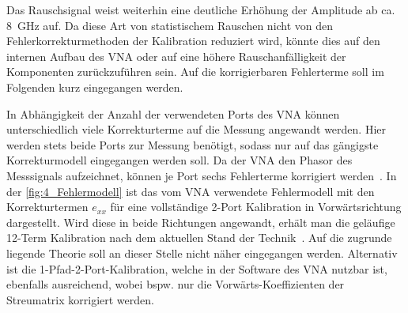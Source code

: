 Das Rauschsignal weist weiterhin eine deutliche Erhöhung der Amplitude ab ca. \SI{8}{\giga\hertz} auf. Da diese Art von statistischem Rauschen nicht von den Fehlerkorrekturmethoden der Kalibration reduziert wird, könnte dies auf den internen Aufbau des VNA oder auf eine höhere Rauschanfälligkeit der Komponenten zurückzuführen sein. Auf die korrigierbaren Fehlerterme soll im Folgenden kurz eingegangen werden.
\par
\vspace{\linespace}
In Abhängigkeit der Anzahl der verwendeten Ports des VNA können unterschiedlich viele Korrekturterme auf die Messung angewandt werden. Hier werden stets beide Ports zur Messung benötigt, sodass nur auf das gängigste Korrekturmodell eingegangen werden soll. Da der VNA den Phasor des Messsignals aufzeichnet, können je Port sechs Fehlerterme korrigiert werden~\cite{VNA-Handbuch}. In der \Abb\ref{fig:4_Fehlermodell} ist das vom VNA verwendete Fehlermodell mit den Korrekturtermen $e_{xx}$ für eine vollständige 2-Port Kalibration in Vorwärtsrichtung dargestellt. Wird diese in beide Richtungen angewandt, erhält man die geläufige \mbox{12-Term} Kalibration nach dem aktuellen Stand der Technik~\cite{VNA_Error_Models_and_Calibration_Methods}. Auf die zugrunde liegende Theorie soll an dieser Stelle nicht näher eingegangen werden. Alternativ ist die 1-Pfad-2-Port-Kalibration, welche in der Software des VNA nutzbar ist, ebenfalls ausreichend, wobei bspw. nur die Vorwärts-Koeffizienten der Streumatrix korrigiert werden. 
\par
\vspace{\linespace}


